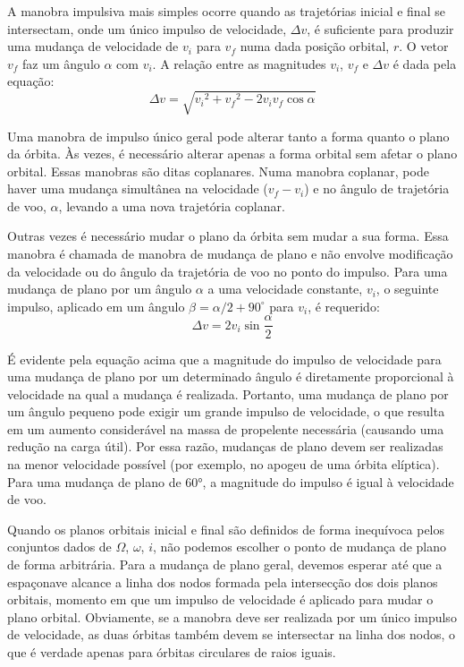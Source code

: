 A manobra impulsiva mais simples ocorre quando as trajetórias inicial e final se intersectam, onde um único impulso de velocidade, $\Delta v$, é suficiente para produzir uma mudança de velocidade de $v_i$ para $v_f$ numa dada posição orbital, $r$. O vetor $v_f$ faz um ângulo $\alpha$ com $v_i$. A relação entre as magnitudes $v_i$, $v_f$ e $\Delta v$ é dada pela equação:
\begin{equation}
\Delta v=\sqrt{{v_i}^2+{v_f}^2-2v_iv_f\cos\alpha}
\label{eq:5.37}
\end{equation}

Uma manobra de impulso único geral pode alterar tanto a forma quanto o plano da órbita. Às vezes, é necessário alterar apenas a forma orbital sem afetar o plano orbital. Essas manobras são ditas coplanares. Numa manobra coplanar, pode haver uma mudança simultânea na velocidade ($v_f -v_i$) e no ângulo de trajetória de voo, $\alpha$, levando a uma nova trajetória coplanar.

Outras vezes é necessário mudar o plano da órbita sem mudar a sua forma. Essa manobra é chamada de manobra de mudança de plano e não envolve modificação da velocidade ou do ângulo da trajetória de voo no ponto do impulso. Para uma mudança de plano por um ângulo $\alpha$ a uma velocidade constante, $v_i$, o seguinte impulso, aplicado em um ângulo $\beta = \alpha/2 + 90^\circ$ para $v_i$, é requerido:
\begin{equation}
\Delta v=2v_i\sin\frac{\alpha}{2}
\label{eq:5.38}
\end{equation}

É evidente pela equação acima que a magnitude do impulso de velocidade para uma mudança de plano por um determinado ângulo é diretamente proporcional à velocidade na qual a mudança é realizada. Portanto, uma mudança de plano por um ângulo pequeno pode exigir um grande impulso de velocidade, o que resulta em um aumento considerável na massa de propelente necessária (causando uma redução na carga útil). Por essa razão, mudanças de plano devem ser realizadas na menor velocidade possível (por exemplo, no apogeu de uma órbita elíptica). Para uma mudança de plano de 60°, a magnitude do impulso é igual à velocidade de voo.

Quando os planos orbitais inicial e final são definidos de forma inequívoca pelos conjuntos dados de $\Omega$, $\omega$, $i$, não podemos escolher o ponto de mudança de plano de forma arbitrária. Para a mudança de plano geral, devemos esperar até que a espaçonave alcance a linha dos nodos formada pela intersecção dos dois planos orbitais, momento em que um impulso de velocidade é aplicado para mudar o plano orbital. Obviamente, se a manobra deve ser realizada por um único impulso de velocidade, as duas órbitas também devem se intersectar na linha dos nodos, o que é verdade apenas para órbitas circulares de raios iguais.

